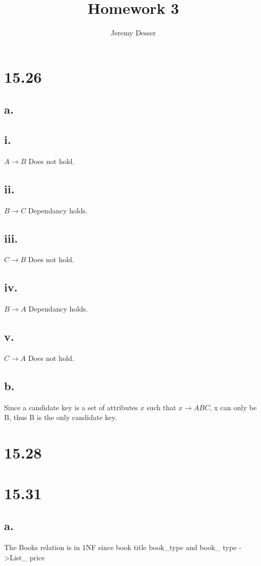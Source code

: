 \documentclass[11pt]{article}
\theoremstyle{plain}
\theoremstyle{definition}
\begin{document}
 


\title{Homework 3}
\author{Jeremy Desser}
\begin{titlepage}
\maketitle
\end{titlepage}


\section*{15.26}
\subsection*{a.}
\subsection*{i.} $A \rightarrow B $ Does not hold.
\subsection*{ii.} $B \rightarrow C $ Dependancy holds.
\subsection*{iii.} $C \rightarrow B $ Does not hold.
\subsection*{iv.} $B \rightarrow A $ Dependancy holds.
\subsection*{v.} $C \rightarrow A $ Does not hold.


\subsection*{b.}
 Since a candidate key  is a set of attributes $x$ such that $x \rightarrow ABC$, x can only be B, thus B is the only candidate key.
\section*{15.28} 


\section*{15.31} 
\subsection*{a.}
The Books relation is in 1NF since book title \rightarrow book\_type and book\_ type ->List\_ price\\
\end{document}
